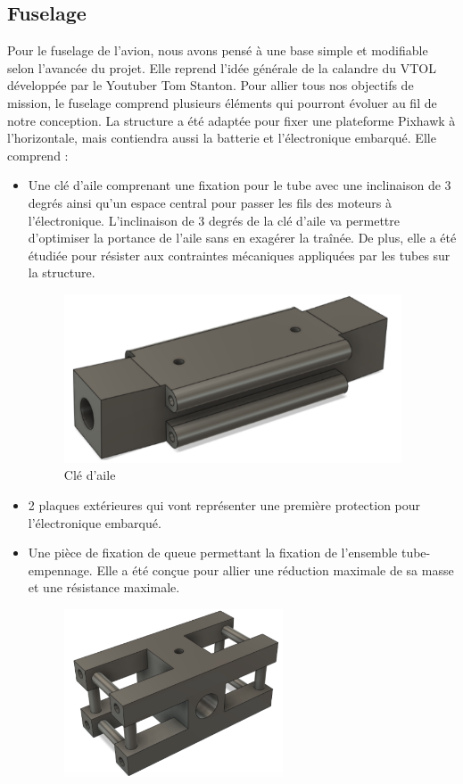 \documentclass[a4paper,12pt,french]{report}
\begin{document}
\subsection{Fuselage}

Pour le fuselage de l’avion, nous avons pensé à une base simple et modifiable selon l’avancée du projet. Elle reprend l’idée générale de la calandre du VTOL développée par le Youtuber Tom Stanton. Pour allier tous nos objectifs de mission, le fuselage  comprend plusieurs éléments qui pourront évoluer au fil de notre conception. La structure a été adaptée pour fixer une plateforme Pixhawk à l’horizontale, mais contiendra aussi la batterie et l’électronique embarqué. Elle comprend :

\begin{itemize}
    \item Une clé d’aile comprenant une fixation pour le tube avec une inclinaison de 3 degrés ainsi qu’un espace central pour  passer les fils des moteurs à l'électronique. L'inclinaison de 3 degrés de la clé d'aile va permettre d’optimiser la portance de l’aile sans en exagérer la traînée. De plus, elle a été étudiée pour résister aux contraintes mécaniques appliquées par les tubes sur la structure.
          \begin{figure}[h]
              \centering
              \includegraphics[height=5cm]{figures/cle.png}
              \caption{Clé d'aile}
              \label{clé}
          \end{figure}
    \item 2 plaques extérieures qui vont représenter une première protection pour l’électronique embarqué.
    \item Une pièce de fixation de queue permettant la fixation de l’ensemble tube-empennage. Elle a été conçue pour allier une réduction maximale de sa masse et une résistance maximale.
          \begin{figure}[h]
              \centering
              \includegraphics[height=5cm]{figures/arr.png}

\end{figure}
\end{itemize}
\end{document}
